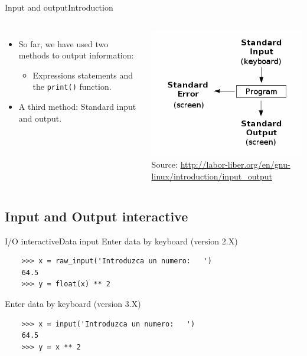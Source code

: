 \documentclass[10pt,compress]{beamer} %
\begin{document}
\begin{frame}[fragile]{Input and output}{Introduction}
    \begin{columns}
	\begin{itemize}
		\item So far, we have used two methods to output information:
			\begin{itemize}
			\item Expressions statements and the \texttt{print()} function.
			\end{itemize}
		\item A third method: Standard input and output.\\
	\end{itemize}
  			\includegraphics[width=\textwidth]{figs/InputOutput.png}\\
			\centering \tiny{Source: \url{http://labor-liber.org/en/gnu-linux/introduction/input\_output}}
	\end{columns}
\end{frame}

\subsection{Input and Output interactive}


\begin{frame}[fragile]{I/O interactive}{Data input}
Enter data  by keyboard  (version 2.X)
\begin{verbatim}
	>>> x = raw_input('Introduzca un numero:   ')
	64.5
	>>> y = float(x) ** 2
\end{verbatim}	
	Enter data  by keyboard  (version 3.X)
\begin{verbatim}	
	>>> x = input('Introduzca un numero:   ')
	64.5
	>>> y = x ** 2
\end{verbatim}
\end{frame}
\end{document}
